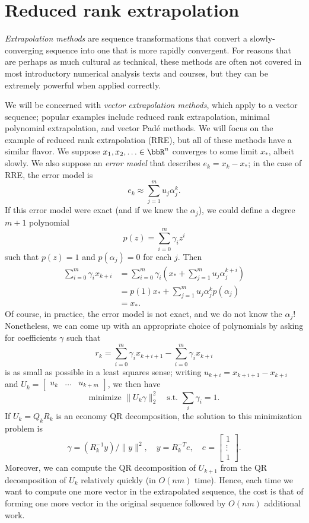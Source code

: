 \documentclass[12pt, leqno]{article} %
\begin{document}
\section{Reduced rank extrapolation}

{\em Extrapolation methods} are sequence transformations that convert
a slowly-converging sequence into one that is more rapidly convergent.
For reasons that are perhaps as much cultural as technical, these
methods are often not covered in most introductory numerical analysis
texts and courses, but they can be extremely powerful when applied
correctly.

We will be concerned with {\em vector extrapolation methods}, which
apply to a vector sequence; popular examples include reduced rank
extrapolation, minimal polynomial extrapolation, and vector Pad\'e
methods.  We will focus on the example of reduced rank extrapolation (RRE),
but all of these methods have a similar flavor.  We suppose
$x_1, x_2, \ldots \in \bbR^n$ converges to some limit $x_*$, albeit slowly.
We also suppose an {\em error model} that describes $e_k = x_k-x_*$;
in the case of RRE, the error model is
\[
  e_k \approx \sum_{j=1}^m u_j \alpha_j^k.
\]
If this error model were exact (and if we knew the $\alpha_j$),
we could define a degree $m+1$ polynomial
\[
  p(z) = \sum_{i=0}^m \gamma_i z^i
\]
such that $p(z) = 1$ and $p(\alpha_j) = 0$ for each $j$.  Then
\begin{align*}
  \sum_{i=0}^m \gamma_i x_{k+i}
  &= \sum_{i=0}^m \gamma_i \left(x_* + \sum_{j=1}^m u_j \alpha_j^{k+i}\right) \\
  &= p(1) x_* + \sum_{j=1}^m u_j \alpha_j^k p(\alpha_j) \\
  &= x_*.
\end{align*}
Of course, in practice, the error model is not exact, and we do not
know the $\alpha_j$!  Nonetheless, we can come up with an appropriate
choice of polynomials by asking for coefficients $\gamma$ such that
\[
  r_k =  \sum_{i=0}^m \gamma_i x_{k+i+1} - \sum_{i=0}^m \gamma_i x_{k+i}
\]
is as small as possible in a least squares sense;
writing $u_{k+i} = x_{k+i+1}-x_{k+i}$ and
$U_k = \begin{bmatrix} u_k & \ldots & u_{k+m} \end{bmatrix}$, we then have
\[
  \mbox{minimize } \|U_k \gamma\|_2^2 \quad \mbox{s.t. } \sum_i \gamma_i = 1.
\]
If $U_k = Q_k R_k$ is an economy QR decomposition, the solution to
this minimization problem is
\[
  \gamma = (R_k^{-1} y)/\|y\|^2, \quad y = R_k^{-T} e, \quad e
  = \begin{bmatrix} 1 \\ \vdots \\1 \end{bmatrix}.
\]
Moreover, we can compute the QR decomposition of $U_{k+1}$ from the QR
decomposition of $U_k$ relatively quickly (in $O(nm)$ time).  Hence,
each time we want to compute one more vector in the extrapolated
sequence, the cost is that of forming one more vector in the original
sequence followed by $O(nm)$ additional work.
\end{document}
